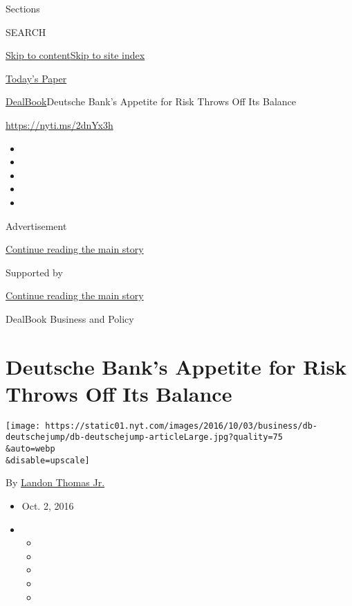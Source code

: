 Sections

SEARCH

\protect\hyperlink{site-content}{Skip to
content}\protect\hyperlink{site-index}{Skip to site index}

\href{https://myaccount.nytimes.com/auth/login?response_type=cookie\&client_id=vi}{}

\href{https://www.nytimes.com/section/todayspaper}{Today's Paper}

\href{/section/business/dealbook}{DealBook}\textbar{}Deutsche Bank's
Appetite for Risk Throws Off Its Balance

\url{https://nyti.ms/2dnYx3h}

\begin{itemize}
\item
\item
\item
\item
\item
\end{itemize}

Advertisement

\protect\hyperlink{after-top}{Continue reading the main story}

Supported by

\protect\hyperlink{after-sponsor}{Continue reading the main story}

DealBook Business and Policy

\hypertarget{deutsche-banks-appetite-for-risk-throws-off-its-balance}{%
\section{Deutsche Bank's Appetite for Risk Throws Off Its
Balance}\label{deutsche-banks-appetite-for-risk-throws-off-its-balance}}

\texttt{[image: https://static01.nyt.com/images/2016/10/03/business/db-deutschejump/db-deutschejump-articleLarge.jpg?quality=75\\\&auto=webp\\\&disable=upscale]}

By \href{http://www.nytimes.com/by/landon-thomas-jr}{Landon Thomas Jr.}

\begin{itemize}
\item
  Oct. 2, 2016
\item
  \begin{itemize}
  \item
  \item
  \item
  \item
  \item
  \end{itemize}
\end{itemize}

